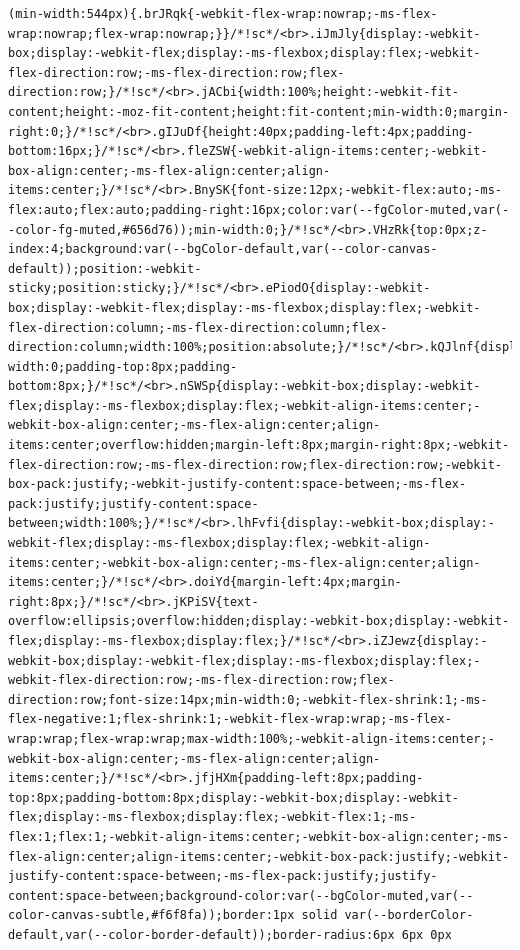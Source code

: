 \documentclass[
  letterpaper,
]{book}
\begin{document}
\begin{verbatim}
(min-width:544px){.brJRqk{-webkit-flex-wrap:nowrap;-ms-flex-wrap:nowrap;flex-wrap:nowrap;}}/*!sc*/<br>.iJmJly{display:-webkit-box;display:-webkit-flex;display:-ms-flexbox;display:flex;-webkit-flex-direction:row;-ms-flex-direction:row;flex-direction:row;}/*!sc*/<br>.jACbi{width:100%;height:-webkit-fit-content;height:-moz-fit-content;height:fit-content;min-width:0;margin-right:0;}/*!sc*/<br>.gIJuDf{height:40px;padding-left:4px;padding-bottom:16px;}/*!sc*/<br>.fleZSW{-webkit-align-items:center;-webkit-box-align:center;-ms-flex-align:center;align-items:center;}/*!sc*/<br>.BnySK{font-size:12px;-webkit-flex:auto;-ms-flex:auto;flex:auto;padding-right:16px;color:var(--fgColor-muted,var(--color-fg-muted,#656d76));min-width:0;}/*!sc*/<br>.VHzRk{top:0px;z-index:4;background:var(--bgColor-default,var(--color-canvas-default));position:-webkit-sticky;position:sticky;}/*!sc*/<br>.ePiodO{display:-webkit-box;display:-webkit-flex;display:-ms-flexbox;display:flex;-webkit-flex-direction:column;-ms-flex-direction:column;flex-direction:column;width:100%;position:absolute;}/*!sc*/<br>.kQJlnf{display:none;min-width:0;padding-top:8px;padding-bottom:8px;}/*!sc*/<br>.nSWSp{display:-webkit-box;display:-webkit-flex;display:-ms-flexbox;display:flex;-webkit-align-items:center;-webkit-box-align:center;-ms-flex-align:center;align-items:center;overflow:hidden;margin-left:8px;margin-right:8px;-webkit-flex-direction:row;-ms-flex-direction:row;flex-direction:row;-webkit-box-pack:justify;-webkit-justify-content:space-between;-ms-flex-pack:justify;justify-content:space-between;width:100%;}/*!sc*/<br>.lhFvfi{display:-webkit-box;display:-webkit-flex;display:-ms-flexbox;display:flex;-webkit-align-items:center;-webkit-box-align:center;-ms-flex-align:center;align-items:center;}/*!sc*/<br>.doiYd{margin-left:4px;margin-right:8px;}/*!sc*/<br>.jKPiSV{text-overflow:ellipsis;overflow:hidden;display:-webkit-box;display:-webkit-flex;display:-ms-flexbox;display:flex;}/*!sc*/<br>.iZJewz{display:-webkit-box;display:-webkit-flex;display:-ms-flexbox;display:flex;-webkit-flex-direction:row;-ms-flex-direction:row;flex-direction:row;font-size:14px;min-width:0;-webkit-flex-shrink:1;-ms-flex-negative:1;flex-shrink:1;-webkit-flex-wrap:wrap;-ms-flex-wrap:wrap;flex-wrap:wrap;max-width:100%;-webkit-align-items:center;-webkit-box-align:center;-ms-flex-align:center;align-items:center;}/*!sc*/<br>.jfjHXm{padding-left:8px;padding-top:8px;padding-bottom:8px;display:-webkit-box;display:-webkit-flex;display:-ms-flexbox;display:flex;-webkit-flex:1;-ms-flex:1;flex:1;-webkit-align-items:center;-webkit-box-align:center;-ms-flex-align:center;align-items:center;-webkit-box-pack:justify;-webkit-justify-content:space-between;-ms-flex-pack:justify;justify-content:space-between;background-color:var(--bgColor-muted,var(--color-canvas-subtle,#f6f8fa));border:1px solid var(--borderColor-default,var(--color-border-default));border-radius:6px 6px 0px 
\end{verbatim}
\end{document}
